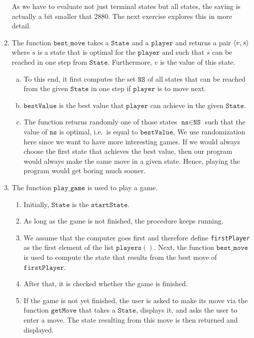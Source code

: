 \begin{enumerate}
      As we have to evaluate not just terminal states but all states, the saving is actually a bit smaller that
      2880.  The next exercise explores this in more detail.
\item The function $\texttt{best\_move}$ takes a $\texttt{State}$ and a $\texttt{player}$ and returns a pair $\pair(v,s)$
      where $s$ is a state that is optimal for the $\texttt{player}$ and such that $s$ can be reached in one step from
      $\texttt{State}$.  Furthermore, $v$ is the value of this state.
      \begin{enumerate}[(a)]
      \item To this end, it first computes the set $\texttt{NS}$ of all states that can be reached 
            from the given $\texttt{State}$ in one step if $\texttt{player}$ is to move next.
      \item $\texttt{bestValue}$ is the best value that $\texttt{player}$ can achieve in the given $\texttt{State}$.
      \item The function returns randomly one of those states $\texttt{ns} \in \texttt{NS}$ such that 
            the value of $\texttt{ns}$ is optimal, i.e.~is equal to $\texttt{bestValue}$.
            We use randomization here since we want to have more interesting games.  If we would always choose
            the first state that achieves the best value, then our program would always make the same move in
            a given state.  Hence, playing the program would get boring much sooner.
      \end{enumerate}
\item The function $\texttt{play\_game}$ is used to play a game.
      \begin{enumerate}
      \item Initially, $\texttt{State}$ is the $\texttt{startState}$.
      \item As long as the game is not finished, the procedure keeps running.
      \item We assume that the computer goes first and therefore define  \texttt{firstPlayer} as the first
            element of the list $\texttt{players}()$.  Next, the function $\texttt{best\_move}$ is used to
            compute the state that results from the best move of $\texttt{firstPlayer}$.
      \item After that, it is checked whether the game is finished.
      \item If the game is not  yet finished, the user is asked to make its move via the function
            $\texttt{getMove}$ that takes a $\texttt{State}$, displays it, and asks the user to enter a move.
            The state resulting from this move is then returned and displayed.


\end{enumerate}
\end{enumerate}
